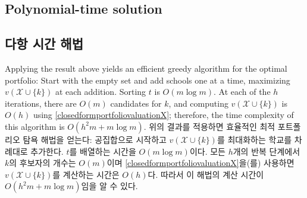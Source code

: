 \documentclass[11pt]{article} %
\DeclareMathOperator*{\argmax}{arg\,max}
\newtheorem{theorem}{Theorem}
\theoremstyle{definition}
\newtheorem{theorem}{정리}
\theoremstyle{definition}
\begin{document}
\ifen \subsection{Polynomial-time solution} \else \subsection{다항 시간 해법}\fi
\ifen Applying the result above yields an efficient greedy algorithm for the optimal portfolio: Start with the empty set and add schools one at a time, maximizing $v(\mathcal{X}\cup \{k\})$ at each addition. Sorting $t$ is  $O(m \log m)$.  At each of the $h$ iterations, there are $O(m)$ candidates for $k$, and computing $v(\mathcal{X}\cup \{k\})$ is $O(h)$ using \eqref{closedformportfoliovaluationX}; therefore, the time complexity of this algorithm is $O(h^2 m + m \log m)$. 
\else 위의 결과를 적용하면 효율적인 최적 포트폴리오 탐욕 해법을 얻는다: 공집합으로 시작하고 $v(\mathcal{X}\cup \{k\})$를 최대화하는 학교를 차례대로 추가한다. $t$를 배열하는 시간을 $O(m \log m)$이다. 모든 $h$개의 반복 단계에서 $k$의 후보자의 개수는 $O(m)$이며 \eqref{closedformportfoliovaluationX}을(를) 사용하면 $v(\mathcal{X}\cup \{k\})$를 계산하는 시간은 $O(h)$다. 따라서 이 해법의 계산 시간이 $O(h^2 m + m \log m)$임을 알 수 있다.\fi
%
\end{document}
